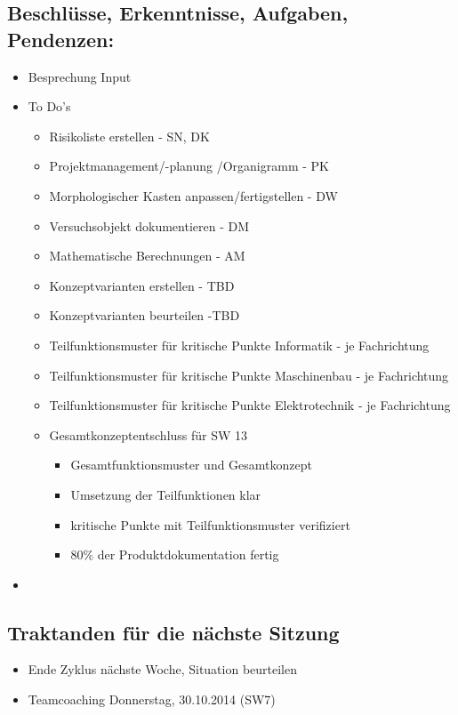 \documentclass[a4paper,10pt,fleqn]{article}
\begin{document}
\subsection*{Beschlüsse, Erkenntnisse, Aufgaben, Pendenzen:}
\begin{itemize}
    \item Besprechung Input
    \item To Do's
    \begin{itemize}
        \item Risikoliste erstellen - SN, DK
        \item Projektmanagement/-planung /Organigramm - PK
        \item Morphologischer Kasten anpassen/fertigstellen - DW
        \item Versuchsobjekt dokumentieren - DM
        \item Mathematische Berechnungen - AM
        \item Konzeptvarianten erstellen - TBD
        \item Konzeptvarianten beurteilen -TBD
        \item Teilfunktionsmuster für kritische Punkte Informatik - je Fachrichtung 
        \item Teilfunktionsmuster für kritische Punkte Maschinenbau - je Fachrichtung
	    \item Teilfunktionsmuster für kritische Punkte Elektrotechnik - je Fachrichtung
        \item Gesamtkonzeptentschluss für SW 13
        \begin{itemize}
            \item Gesamtfunktionsmuster und Gesamtkonzept
            \item Umsetzung der Teilfunktionen klar
            \item kritische Punkte mit Teilfunktionsmuster verifiziert
            \item 80\% der Produktdokumentation fertig
        \end{itemize}
    \end{itemize}
    \item 
\end{itemize}
%
\subsection*{Traktanden für die nächste Sitzung}
\begin{itemize}
    \item Ende Zyklus nächste Woche, Situation beurteilen
    \item Teamcoaching Donnerstag, 30.10.2014 (SW7)
    
\end{itemize}
%
\end{document}
